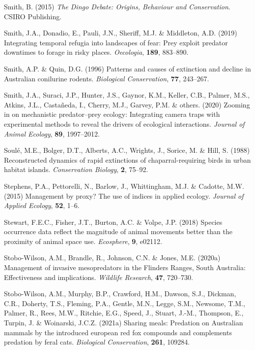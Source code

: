 \documentclass[11pt,a4paper,titlepage,twoside,openright]{style/unimelbthesis}
\begin{document}
\begin{mainmatter}
\leavevmode\hypertarget{ref-smith2015dingo}{}%
Smith, B. (2015) \emph{The Dingo Debate: Origins, Behaviour and Conservation}. CSIRO Publishing.

\leavevmode\hypertarget{ref-smith2019integrating}{}%
Smith, J.A., Donadio, E., Pauli, J.N., Sheriff, M.J. \& Middleton, A.D. (2019) Integrating temporal refugia into landscapes of fear: Prey exploit predator downtimes to forage in risky places. \emph{Oecologia}, \textbf{189}, 883--890.

\leavevmode\hypertarget{ref-smith1996patterns}{}%
Smith, A.P. \& Quin, D.G. (1996) Patterns and causes of extinction and decline in Australian conilurine rodents. \emph{Biological Conservation}, \textbf{77}, 243--267.

\leavevmode\hypertarget{ref-smith2020zooming}{}%
Smith, J.A., Suraci, J.P., Hunter, J.S., Gaynor, K.M., Keller, C.B., Palmer, M.S., Atkins, J.L., Castañeda, I., Cherry, M.J., Garvey, P.M. \& others. (2020) Zooming in on mechanistic predator--prey ecology: Integrating camera traps with experimental methods to reveal the drivers of ecological interactions. \emph{Journal of Animal Ecology}, \textbf{89}, 1997--2012.

\leavevmode\hypertarget{ref-soule1988reconstructed}{}%
Soulé, M.E., Bolger, D.T., Alberts, A.C., Wrights, J., Sorice, M. \& Hill, S. (1988) Reconstructed dynamics of rapid extinctions of chaparral-requiring birds in urban habitat islands. \emph{Conservation Biology}, \textbf{2}, 75--92.

\leavevmode\hypertarget{ref-stephens2015management}{}%
Stephens, P.A., Pettorelli, N., Barlow, J., Whittingham, M.J. \& Cadotte, M.W. (2015) Management by proxy? The use of indices in applied ecology. \emph{Journal of Applied Ecology}, \textbf{52}, 1--6.

\leavevmode\hypertarget{ref-stewart2018species}{}%
Stewart, F.E.C., Fisher, J.T., Burton, A.C. \& Volpe, J.P. (2018) Species occurrence data reflect the magnitude of animal movements better than the proximity of animal space use. \emph{Ecosphere}, \textbf{9}, e02112.

\leavevmode\hypertarget{ref-stobo2020management}{}%
Stobo-Wilson, A.M., Brandle, R., Johnson, C.N. \& Jones, M.E. (2020a) Management of invasive mesopredators in the Flinders Ranges, South Australia: Effectiveness and implications. \emph{Wildlife Research}, \textbf{47}, 720--730.

\leavevmode\hypertarget{ref-stobo2021sharing}{}%
Stobo-Wilson, A.M., Murphy, B.P., Crawford, H.M., Dawson, S.J., Dickman, C.R., Doherty, T.S., Fleming, P.A., Gentle, M.N., Legge, S.M., Newsome, T.M., Palmer, R., Rees, M.W., Ritchie, E.G., Speed, J., Stuart, J.-M., Thompson, E., Turpin, J. \& Woinarski, J.C.Z. (2021a) Sharing meals: Predation on Australian mammals by the introduced european red fox compounds and complements predation by feral cats. \emph{Biological Conservation}, \textbf{261}, 109284.


\end{mainmatter}
\end{document}
